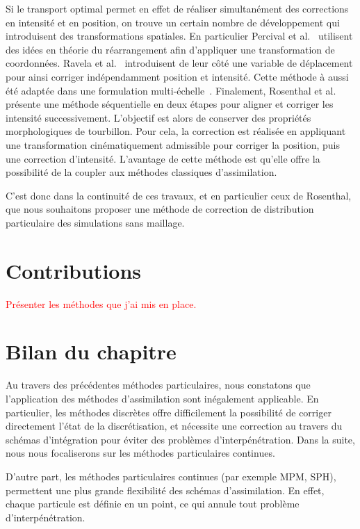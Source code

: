 Si le transport optimal permet en effet de réaliser simultanément des corrections en intensité et en position, on trouve un certain nombre de développement qui introduisent des transformations spatiales. En particulier Percival et al.~\cite{percival_department_2008} utilisent des idées en théorie du réarrangement afin d'appliquer une transformation de coordonnées. Ravela et al.~\cite{ravela_data_2007} introduisent de leur côté une variable de déplacement pour ainsi corriger indépendamment position et intensité. Cette méthode à aussi été adaptée dans une formulation multi-échelle~\cite{ying_multiscale_2019,ying_improving_2023}. Finalement, Rosenthal et al.~\cite{rosenthal_displacement_2017} présente une méthode séquentielle en deux étapes pour aligner et corriger les intensité successivement. L'objectif est alors de conserver des propriétés morphologiques de tourbillon. Pour cela, la correction est réalisée en appliquant une transformation cinématiquement admissible pour corriger la position, puis une correction d'intensité. L'avantage de cette méthode est qu'elle offre la possibilité de la coupler aux méthodes classiques d'assimilation.

C'est donc dans la continuité de ces travaux, et en particulier ceux de Rosenthal, que nous souhaitons proposer une méthode de correction de distribution particulaire des simulations sans maillage.

\section{Contributions}

\textcolor{red}{Présenter les méthodes que j'ai mis en place.}
\section{Bilan du chapitre}

Au travers des précédentes méthodes particulaires, nous constatons que l'application des méthodes d'assimilation sont inégalement applicable. En particulier, les méthodes discrètes offre difficilement la possibilité de corriger directement l'état de la discrétisation, et nécessite une correction au travers du schémas d'intégration pour éviter des problèmes d'interpénétration. Dans la suite, nous nous focaliserons sur les méthodes particulaires continues.

D'autre part, les méthodes particulaires continues (par exemple MPM, SPH), permettent une plus grande flexibilité des schémas d'assimilation. En effet, chaque particule est définie en un point, ce qui annule tout problème d'interpénétration.

